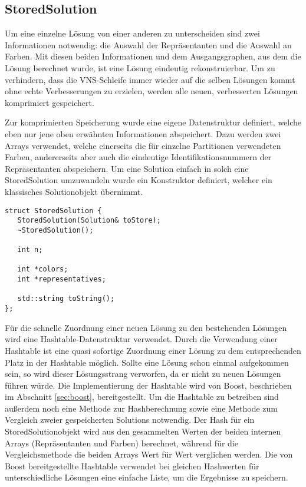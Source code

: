 \subsection{StoredSolution}
Um eine einzelne Lösung von einer anderen zu unterscheiden sind zwei Informationen notwendig: die Auswahl der Repräsentanten und die Auswahl 
an Farben. Mit diesen beiden Informationen und dem Ausgangsgraphen, aus dem die Lösung berechnet wurde, ist eine Lösung eindeutig rekonstruierbar.
Um zu verhindern, dass die VNS-Schleife immer wieder auf die selben Lösungen kommt ohne echte Verbesserungen zu erzielen, werden alle neuen, verbesserten
Lösungen komprimiert gespeichert. 

Zur komprimierten Speicherung wurde eine eigene Datenstruktur definiert, welche eben nur jene oben erwähnten Informationen abspeichert. 
Dazu werden zwei Arrays verwendet, welche einerseits die für einzelne Partitionen verwendeten Farben, andererseits aber auch die 
eindeutige Identifikationsnummern der Repräsentanten abspeichern. Um eine Solution einfach in solch eine StoredSolution umzuwandeln wurde
ein Konstruktor definiert, welcher ein klassisches Solutionobjekt übernimmt. 

\singlespacing
\begin{lstlisting}[caption={Die Signatur von StoredSolution},label={lst:stored}]
struct StoredSolution {
   StoredSolution(Solution& toStore);
   ~StoredSolution();
   
   int n;
   
   int *colors;
   int *representatives;
   
   std::string toString();
};
\end{lstlisting}

Für die schnelle Zuordnung einer neuen Lösung zu den bestehenden Lösungen wird eine Hashtable-Datenstruktur verwendet. Durch die Verwendung einer
Hashtable ist eine quasi sofortige Zuordnung einer Lösung zu dem entsprechenden Platz in der Hashtable möglich. Sollte eine Lösung schon einmal 
aufgekommen sein, so wird dieser Lösungsstrang verworfen, da er nicht zu neuen Lösungen führen würde. Die Implementierung der Hashtable wird von 
Boost, beschrieben im Abschnitt \ref{sec:boost}, bereitgestellt. Um die Hashtable zu betreiben sind außerdem noch eine Methode zur Hashberechnung
sowie eine Methode zum Vergleich zweier gespeicherten Solutions notwendig. Der Hash für ein StoredSolutionobjekt wird aus den gesammelten Werten
der beiden internen Arrays (Repräsentanten und Farben) berechnet, während für die Vergleichsmethode die beiden Arrays Wert für Wert verglichen werden. Die von Boost 
bereitgestellte Hashtable verwendet bei gleichen Hashwerten für unterschiedliche Lösungen eine einfache Liste, um die Ergebnisse zu speichern.

